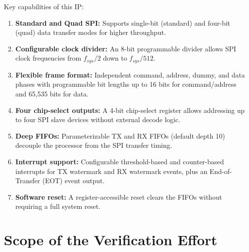 Key capabilities of this IP:
\begin{enumerate}[leftmargin=2em]
  \item \textbf{Standard and Quad SPI:} Supports single-bit (standard) and four-bit (quad) data
        transfer modes for higher throughput.
  \item \textbf{Configurable clock divider:} An 8-bit programmable divider allows SPI clock
        frequencies from $f_{sys}/2$ down to $f_{sys}/512$.
  \item \textbf{Flexible frame format:} Independent command, address, dummy, and data phases with
        programmable bit lengths up to 16 bits for command/address and 65,535 bits for data.
  \item \textbf{Four chip-select outputs:} A 4-bit chip-select register allows addressing up to
        four SPI slave devices without external decode logic.
  \item \textbf{Deep FIFOs:} Parameterizable TX and RX FIFOs (default depth 10) decouple the
        processor from the SPI transfer timing.
  \item \textbf{Interrupt support:} Configurable threshold-based and counter-based interrupts for
        TX watermark and RX watermark events, plus an End-of-Transfer (EOT) event output.
  \item \textbf{Software reset:} A register-accessible reset clears the FIFOs without requiring
        a full system reset.
\end{enumerate}

\section{Scope of the Verification Effort}


